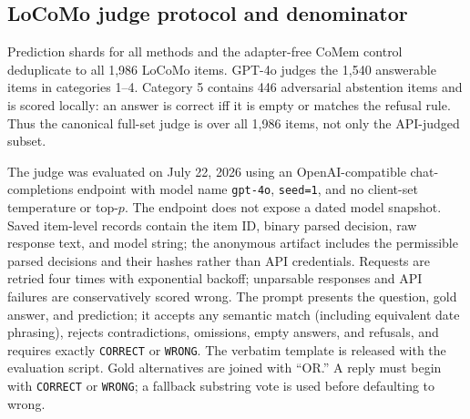 \FloatBarrier
\subsection{LoCoMo judge protocol and denominator}
Prediction shards for all methods and the adapter-free CoMem control deduplicate
to all 1,986 LoCoMo items.
GPT-4o judges the 1,540 answerable items in categories 1--4. Category 5 contains
446 adversarial abstention items and is scored locally: an answer is correct iff
it is empty or matches the refusal rule. Thus the canonical full-set judge is
over all 1,986 items, not only the API-judged subset.

\begin{center}
\small
\captionsetup{hypcap=false}
\setlength{\tabcolsep}{3pt}
\label{tab:locomo-categories}
\end{center}

The judge was evaluated on July 22, 2026 using an OpenAI-compatible
chat-completions endpoint with model name \texttt{gpt-4o}, \texttt{seed=1}, and
no client-set temperature or top-$p$. The endpoint does not expose a dated
model snapshot. Saved item-level records contain the item ID, binary parsed
decision, raw response text, and model string; the anonymous artifact includes
the permissible parsed decisions and their hashes rather than API credentials.
Requests are retried four
times with exponential backoff; unparsable responses and API failures are
conservatively scored wrong. The prompt presents the question, gold answer, and prediction; it accepts any
semantic match (including equivalent date phrasing), rejects contradictions,
omissions, empty answers, and refusals, and requires exactly
\texttt{CORRECT} or \texttt{WRONG}. The verbatim template is released with the
evaluation script.
Gold alternatives are joined with ``OR.'' A reply must begin with
\texttt{CORRECT} or \texttt{WRONG}; a fallback substring vote is used before
defaulting to wrong.

